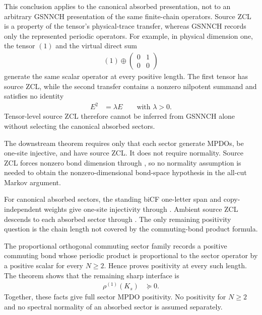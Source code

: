 \documentclass{article}
\begin{document}
This conclusion applies to the canonical absorbed presentation, not to an
arbitrary GSNNCH presentation of the same finite-chain operators. Source ZCL
is a property of the tensor's physical-trace transfer, whereas GSNNCH records
only the represented periodic operators. For example, in physical dimension
one, the tensor $(1)$ and the virtual direct sum
\begin{align}
    (1)\oplus
    \begin{pmatrix}
        0&1\\
        0&0
    \end{pmatrix}
    \label{eq:cpsv16_commuting_form_to_sal_nilpotent_virtual_extension}
\end{align}
generate the same scalar operator at every positive length. The first tensor
has source ZCL, while the second transfer contains a nonzero nilpotent summand
and satisfies no identity
\begin{align}
    E^2
        &=\lambda E
        \qquad\text{with }\lambda>0.
    \label{eq:cpsv16_commuting_form_to_sal_failed_zcl_for_nilpotent_extension}
\end{align}
Tensor-level source ZCL therefore cannot be inferred from GSNNCH alone without
selecting the canonical absorbed sectors.

The downstream theorem
requires only that each sector generate MPDOs, be one-site injective, and have
source ZCL. It does not require normality. Source ZCL forces nonzero bond
dimension through , so no
normality assumption is needed to obtain the nonzero-dimensional bond-space
hypothesis in the all-cut Markov argument.

For canonical absorbed sectors, the standing biCF one-letter span and
copy-independent weights give one-site injectivity through
. Ambient
source ZCL descends to each absorbed sector through
. The only
remaining positivity question is the chain length not covered by the
commuting-bond product formula.

The proportional orthogonal commuting sector family records a positive
commuting bond whose periodic product is proportional to the sector operator
by a positive scalar for every $N\geq2$. Hence
proves positivity at every such length. The theorem
shows that the remaining sharp interface is
\begin{align}
    \rho^{(1)}(K_s)
        &\succeq0.
    \label{eq:cpsv16_commuting_form_to_sal_absorbed_sector_length_one_positivity}
\end{align}
Together, these facts give full sector MPDO positivity. No positivity for
$N\geq2$ and no spectral normality of an absorbed sector is assumed
separately.
\end{document}
